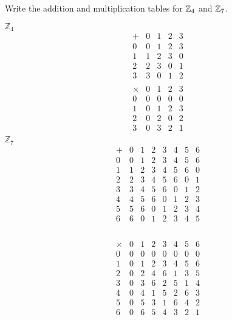 \documentclass[../hw1]{subfiles}
\begin{document}
\begin{problem}[11]
Write the addition and multiplication tables for $\mathbb{Z}_4$ and $\mathbb{Z}_7$.
\end{problem}

$\mathbb{Z}_4$
\[
	\begin{array}{c|cccc}
		+ & 0 & 1 & 2 & 3 \\
		\hline
		0 & 0 & 1 & 2 & 3 \\
		1 & 1 & 2 & 3 & 0 \\
		2 & 2 & 3 & 0 & 1 \\
		3 & 3 & 0 & 1 & 2 \\
	\end{array}
\]
\[
	\begin{array}{c|cccc}
		\times & 0 & 1 & 2 & 3 \\
		\hline
		0      & 0 & 0 & 0 & 0 \\
		1      & 0 & 1 & 2 & 3 \\
		2      & 0 & 2 & 0 & 2 \\
		3      & 0 & 3 & 2 & 1 \\
	\end{array}
\]
$\mathbb{Z}_7$
\[
	\begin{array}{c|ccccccc}
		+ & 0 & 1 & 2 & 3 & 4 & 5 & 6 \\
		\hline
		0 & 0 & 1 & 2 & 3 & 4 & 5 & 6 \\
		1 & 1 & 2 & 3 & 4 & 5 & 6 & 0 \\
		2 & 2 & 3 & 4 & 5 & 6 & 0 & 1 \\
		3 & 3 & 4 & 5 & 6 & 0 & 1 & 2 \\
		4 & 4 & 5 & 6 & 0 & 1 & 2 & 3 \\
		5 & 5 & 6 & 0 & 1 & 2 & 3 & 4 \\
		6 & 6 & 0 & 1 & 2 & 3 & 4 & 5 \\
	\end{array}
\] \\
\[
	\begin{array}{c|ccccccc}
		\times & 0 & 1 & 2 & 3 & 4 & 5 & 6 \\
		\hline
		0      & 0 & 0 & 0 & 0 & 0 & 0 & 0 \\
		1      & 0 & 1 & 2 & 3 & 4 & 5 & 6 \\
		2      & 0 & 2 & 4 & 6 & 1 & 3 & 5 \\
		3      & 0 & 3 & 6 & 2 & 5 & 1 & 4 \\
		4      & 0 & 4 & 1 & 5 & 2 & 6 & 3 \\
		5      & 0 & 5 & 3 & 1 & 6 & 4 & 2 \\
		6      & 0 & 6 & 5 & 4 & 3 & 2 & 1 \\
	\end{array}
\]
\end{document}
